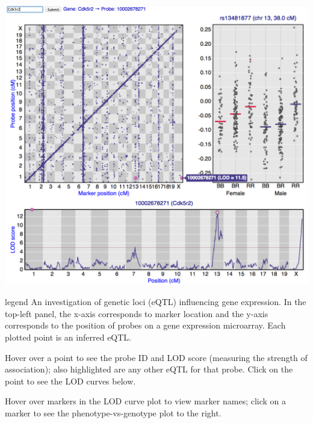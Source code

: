 \documentclass[final,plain]{beamer}
\newlength{\onecolwid}
\newlength{\twocolwid}
\begin{document}
\begin{frame}[t]
\begin{columns}[t]
\begin{column}{\twocolwid}
\begin{columns}[t]
\begin{column}{\onecolwid}
        \centerline{\href{http://www.biostat.wisc.edu/~kbroman/posters/ENAR2014/1d}{\includegraphics[width=\onecolwid]{Figs/1d.png}}}

      \vspace{10mm} %

        \begin{beamercolorbox}[sep=1em, wd=\onecolwid]{legend} \rmfamily
           An investigation of genetic loci (eQTL) influencing gene
           expression.  In the top-left panel, the x-axis corresponds
           to marker location and the y-axis corresponds to the
           position of probes on a gene expression microarray. Each
           plotted point is an inferred eQTL.

           \vspace{12pt}

           Hover over a point to see the probe ID and LOD score
           (measuring the strength of association); also
           highlighted are any other eQTL for that probe.  Click on
           the point to see the LOD curves below.

           \vspace{12pt}

           Hover over markers in the LOD curve plot to view marker
           names; click on a marker to see the phenotype-vs-genotype
           plot to the right.
        \end{beamercolorbox}



\end{column}
\end{columns}
\end{column}
\end{columns}
\end{frame}
\end{document}
